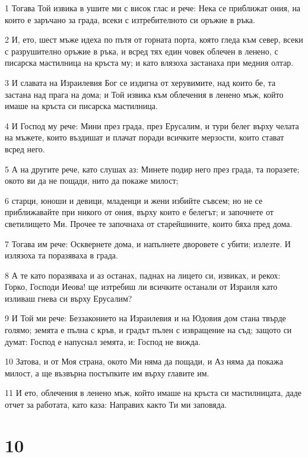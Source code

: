 \par 1 Тогава Той извика в ушите ми с висок глас и рече: Нека се приближат ония, на които е заръчано за града, всеки с изтребителното си оръжие в ръка.
\par 2 И, ето, шест мъже идеха по пътя от горната порта, която гледа към север, всеки с разрушително оръжие в ръка, и всред тях един човек облечен в ленено, с писарска мастилница на кръста му; и като влязоха застанаха при медния олтар.
\par 3 И славата на Израилевия Бог се издигна от херувимите, над които бе, та застана над прага на дома; и Той извика към облечения в ленено мъж, който имаше на кръста си писарска мастилница.
\par 4 И Господ му рече: Мини през града, през Ерусалим, и тури белег върху челата на мъжете, които въздишат и плачат поради всичките мерзости, които стават всред него.
\par 5 А на другите рече, като слушах аз: Минете подир него през града, та поразете; окото ви да не пощади, нито да покаже милост;
\par 6 старци, юноши и девици, младенци и жени избийте съвсем; но не се приближавайте при никого от ония, върху които е белегът; и започнете от светилището Ми. Прочее те започнаха от старейшините, които бяха пред дома.
\par 7 Тогава им рече: Осквернете дома, и напълнете дворовете с убити; излезте. И излязоха та поразяваха в града.
\par 8 А те като поразяваха и аз останах, паднах на лицето си, извиках, и рекох: Горко, Господи Иеова! ще изтребиш ли всичките останали от Израиля като изливаш гнева си върху Ерусалим?
\par 9 И Той ми рече: Беззаконието на Израилевия и на Юдовия дом стана твърде голямо; земята е пълна с кръв, и градът пълен с извращение на съд; защото си думат: Господ е напуснал земята, и: Господ не вижда.
\par 10 Затова, и от Моя страна, окото Ми няма да пощади, и Аз няма да покажа милост, а ще възвърна постъпките им върху главите им.
\par 11 И ето, облечения в ленено мъж, който имаше на кръста си мастилницата, даде отчет за работата, като каза: Направих както Ти ми заповяда.

\chapter{10}

